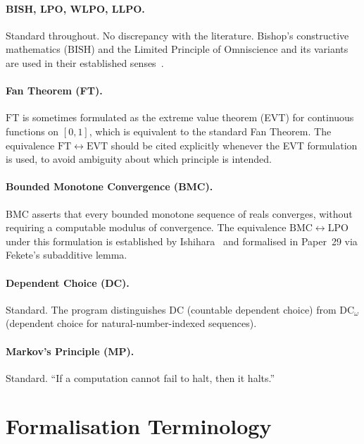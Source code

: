\documentclass[11pt,a4paper]{report}
\theoremstyle{plain}
\theoremstyle{definition}
\theoremstyle{remark}
\newcommand{\BISH}{\mathrm{BISH}}
\newcommand{\LPO}{\mathrm{LPO}}
\newcommand{\FT}{\mathrm{FT}}
\newcommand{\DC}{\mathrm{DC}}
\begin{document}
\paragraph{BISH, LPO, WLPO, LLPO.}
Standard throughout.  No discrepancy with the literature.  Bishop's constructive mathematics ($\BISH$) and the Limited Principle of Omniscience and its variants are used in their established senses~\cite{Bishop1967,BridgesRichman1987,Ishihara2006}.

\paragraph{Fan Theorem (FT).}
$\FT$ is sometimes formulated as the extreme value theorem (EVT) for continuous functions on $[0,1]$, which is equivalent to the standard Fan Theorem.  The equivalence $\FT \leftrightarrow \mathrm{EVT}$ should be cited explicitly whenever the EVT formulation is used, to avoid ambiguity about which principle is intended.

\paragraph{Bounded Monotone Convergence (BMC).}
BMC asserts that every bounded monotone sequence of reals converges, without requiring a computable modulus of convergence.  The equivalence $\mathrm{BMC} \leftrightarrow \LPO$ under this formulation is established by Ishihara~\cite{Ishihara2006} and formalised in Paper~29 via Fekete's subadditive lemma.

\paragraph{Dependent Choice (DC).}
Standard.  The program distinguishes $\DC$ (countable dependent choice) from $\DC_\omega$ (dependent choice for natural-number-indexed sequences).

\paragraph{Markov's Principle (MP).}
Standard.  ``If a computation cannot fail to halt, then it halts.''

\section{Formalisation Terminology}
\end{document}
